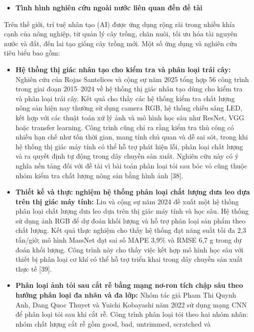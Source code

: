 \documentclass[
]{article}
\begin{document}
\begin{itemize}
\item
  \textbf{Tình hình nghiên cứu ngoài nước liên quan đến đề tài}
\end{itemize}

Trên thế giới, trí tuệ nhân tạo (AI) được ứng dụng rộng rãi trong nhiều
khía cạnh của nông nghiệp, từ quản lý cây trồng, chăn nuôi, tối ưu hóa
tài nguyên nước và đất, đến lai tạo giống cây trồng mới. Một số ứng dụng
và nghiên cứu tiêu biểu bao gồm:

\begin{itemize}
\item
  \textbf{Hệ thống thị giác nhân tạo cho kiểm tra và phân loại trái
  cây:} Nghiên cứu của Rojas Santelices và cộng sự năm 2025 tổng hợp 56
  công trình trong giai đoạn 2015--2024 về hệ thống thị giác nhân tạo
  dùng cho kiểm tra và phân loại trái cây. Kết quả cho thấy các hệ thống
  kiểm tra chất lượng nông sản hiện nay thường sử dụng camera RGB, hệ
  thống chiếu sáng LED, kết hợp với các thuật toán xử lý ảnh và mô hình
  học sâu như ResNet, VGG hoặc transfer learning. Công trình cũng chỉ ra
  rằng kiểm tra thủ công có nhiều hạn chế như tốn thời gian, mang tính
  chủ quan và dễ sai sót, trong khi hệ thống thị giác máy tính có thể hỗ
  trợ phát hiện lỗi, phân loại chất lượng và ra quyết định tự động trong
  dây chuyền sản xuất. Nghiên cứu này có ý nghĩa nền tảng đối với đề tài
  vì bài toán phân loại tỏi sau bóc vỏ cũng thuộc nhóm kiểm tra chất
  lượng nông sản bằng hình ảnh {[}38{]}.
\item
  \textbf{Thiết kế và thực nghiệm hệ thống phân loại chất lượng dưa leo
  dựa trên thị giác máy tính:} Liu và cộng sự năm 2024 đề xuất một hệ
  thống phân loại chất lượng dưa leo dựa trên thị giác máy tính và học
  sâu. Hệ thống sử dụng ảnh RGB để dự đoán khối lượng và hỗ trợ phân
  loại sản phẩm theo chất lượng. Kết quả thực nghiệm cho thấy hệ thống
  đạt năng suất tối đa 2,3 tấn/giờ; mô hình MassNet đạt sai số MAPE
  3,9\% và RMSE 6,7 g trong dự đoán khối lượng. Công trình này cho thấy
  việc kết hợp mô hình học sâu với thiết bị phân loại cơ khí có thể hỗ
  trợ triển khai trong dây chuyền sản xuất thực tế {[}39{]}.
\item
  \textbf{Phân loại ảnh tỏi sau cắt rễ bằng mạng nơ-ron tích chập sâu
  theo hướng phân loại đa nhãn và đa lớp:} Nhóm tác giả Pham Thi Quynh
  Anh, Dang Quoc Thuyet và Yuichi Kobayashi năm 2022 sử dụng mạng CNN để
  phân loại tỏi sau khi cắt rễ. Công trình phân loại tỏi theo hai nhóm
  nhãn: nhóm chất lượng cắt rễ gồm good, bad, untrimmed, scratched và

\end{itemize}
\end{document}
